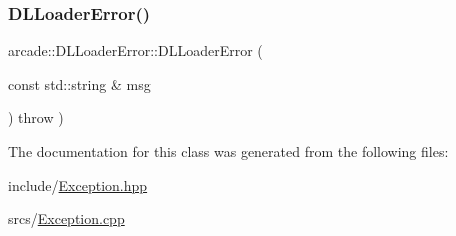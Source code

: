 \mbox{\label{classarcade_1_1_d_l_loader_error_a24f7cd1e5f5e897e535e0219802edb0d}} 
\subsubsection{\texorpdfstring{D\+L\+Loader\+Error()}{DLLoaderError()}}
{\footnotesize\ttfamily arcade\+::\+D\+L\+Loader\+Error\+::\+D\+L\+Loader\+Error (\begin{DoxyParamCaption}\item[{const std\+::string \&}]{msg }\end{DoxyParamCaption}) throw  ) }



The documentation for this class was generated from the following files\+:\begin{DoxyCompactItemize}
\item 
include/\hyperlink{_exception_8hpp}{Exception.\+hpp}\item 
srcs/\hyperlink{_exception_8cpp}{Exception.\+cpp}\end{DoxyCompactItemize}
